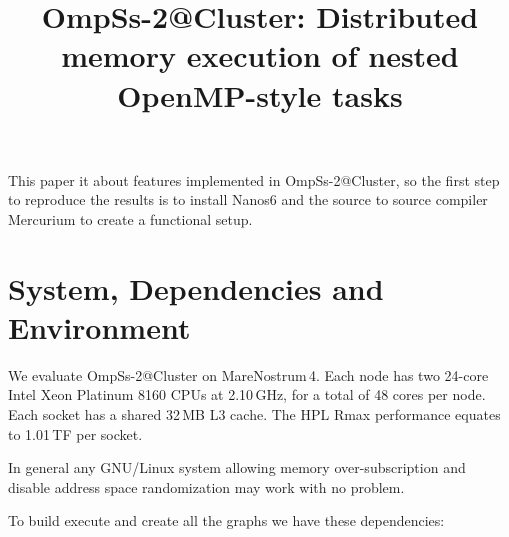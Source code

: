 \documentclass{article}
\begin{document}
\title{OmpSs-2@Cluster: Distributed memory execution of nested OpenMP-style tasks}


\maketitle

This paper it about features implemented in OmpSs-2@Cluster, so the
first step to reproduce the results is to install Nanos6 and the
source to source compiler Mercurium to create a functional setup.

\section{System, Dependencies and Environment}

We evaluate OmpSs-2@Cluster on MareNostrum\,4. Each node has two
24-core Intel Xeon Platinum 8160 CPUs at 2.10\,GHz, for a total of 48
cores per node.  Each socket has a shared 32\,MB L3 cache.  The HPL
Rmax performance equates to 1.01\,TF per socket.

In general any GNU/Linux system allowing memory over-subscription and
disable address space randomization may work with no problem.

To build execute and create all the graphs we have these dependencies:
\end{document}
